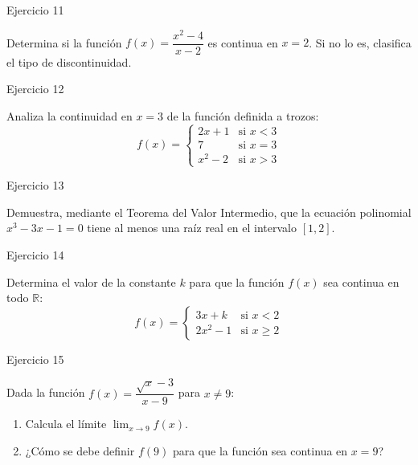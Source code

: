 \documentclass[aspectratio=169]{beamer}
\begin{document}
\begin{frame}{Ejercicio 11}
  \begin{mwejercicio}
    Determina si la función $f(x) = \dfrac{x^2 - 4}{x - 2}$ es continua en $x = 2$. Si no lo es, clasifica el tipo de discontinuidad.
  \end{mwejercicio}
  \vspace{3.5cm}
\end{frame}
\begin{frame}{Ejercicio 12}
  \begin{mwejercicio}
    Analiza la continuidad en $x = 3$ de la función definida a trozos:
    $$f(x) = \begin{cases} 2x + 1 & \text{si } x < 3 \\ 7 & \text{si } x = 3 \\ x^2 - 2 & \text{si } x > 3 \end{cases}$$
  \end{mwejercicio}
  \vspace{3.5cm}
\end{frame}
\begin{frame}{Ejercicio 13}
  \begin{mwejercicio}
    Demuestra, mediante el Teorema del Valor Intermedio, que la ecuación polinomial $x^3 - 3x - 1 = 0$ tiene al menos una raíz real en el intervalo $[1, 2]$.
  \end{mwejercicio}
  \vspace{3.5cm}
\end{frame}
\begin{frame}{Ejercicio 14}
  \begin{mwejercicio}
    Determina el valor de la constante $k$ para que la función $f(x)$ sea continua en todo $\mathbb{R}$:
    $$f(x) = \begin{cases} 3x + k & \text{si } x < 2 \\ 2x^2 - 1 & \text{si } x \ge 2 \end{cases}$$
  \end{mwejercicio}
  \vspace{3.5cm}
\end{frame}
\begin{frame}{Ejercicio 15}
  \begin{mwejercicio}
    Dada la función $f(x) = \dfrac{\sqrt{x} - 3}{x - 9}$ para $x \neq 9$:
    \begin{enumerate}
      \item Calcula el límite $\lim_{x \to 9} f(x)$.
      \item ¿Cómo se debe definir $f(9)$ para que la función sea continua en $x = 9$?
    \end{enumerate}
  \end{mwejercicio}
  \vspace{3.5cm}
\end{frame}
\end{document}
